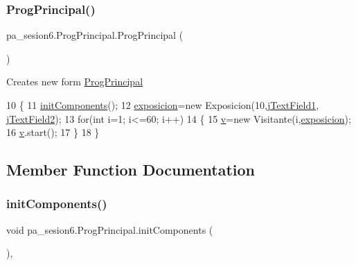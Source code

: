 \subsubsection{\texorpdfstring{Prog\+Principal()}{ProgPrincipal()}}
{\footnotesize\ttfamily pa\+\_\+sesion6.\+Prog\+Principal.\+Prog\+Principal (\begin{DoxyParamCaption}{ }\end{DoxyParamCaption})\hspace{0.3cm}{\ttfamily [inline]}}

Creates new form \mbox{\hyperlink{classpa__sesion6_1_1_prog_principal}{Prog\+Principal}} 
\begin{DoxyCode}
10     \{
11         \mbox{\hyperlink{classpa__sesion6_1_1_prog_principal_a6c2bc36ec75138743c72ca080398711a}{initComponents}}();
12         \mbox{\hyperlink{classpa__sesion6_1_1_prog_principal_a1287569c58f606024f2dc4216a267f9e}{exposicion}}=\textcolor{keyword}{new} Exposicion(10,\mbox{\hyperlink{classpa__sesion6_1_1_prog_principal_a1b336bc5700d2300c7c85f594b2a67c5}{jTextField1}},
      \mbox{\hyperlink{classpa__sesion6_1_1_prog_principal_a0381b47538147a043d91431e3cb981dc}{jTextField2}});
13         \textcolor{keywordflow}{for}(\textcolor{keywordtype}{int} i=1; i<=60; i++)
14         \{
15             \mbox{\hyperlink{classpa__sesion6_1_1_prog_principal_a9cdcee1df6de542f0fc8986b02633891}{v}}=\textcolor{keyword}{new} Visitante(i,\mbox{\hyperlink{classpa__sesion6_1_1_prog_principal_a1287569c58f606024f2dc4216a267f9e}{exposicion}});
16             \mbox{\hyperlink{classpa__sesion6_1_1_prog_principal_a9cdcee1df6de542f0fc8986b02633891}{v}}.start();
17         \}
18     \}
\end{DoxyCode}


\subsection{Member Function Documentation}
\mbox{\label{classpa__sesion6_1_1_prog_principal_a6c2bc36ec75138743c72ca080398711a}} 
\subsubsection{\texorpdfstring{init\+Components()}{initComponents()}}
{\footnotesize\ttfamily void pa\+\_\+sesion6.\+Prog\+Principal.\+init\+Components (\begin{DoxyParamCaption}{ }\end{DoxyParamCaption})\hspace{0.3cm}{\ttfamily [inline]}, {\ttfamily [private]}}

